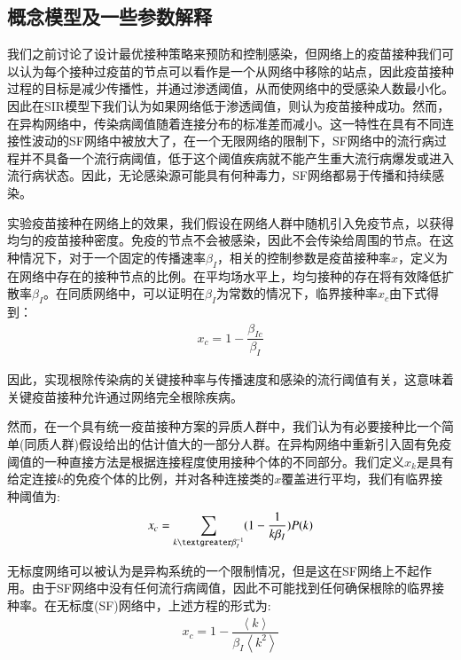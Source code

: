 \documentclass[UTF8]{ctexart}
\begin{document}
\subsection{概念模型及一些参数解释}
我们之前讨论了设计最优接种策略来预防和控制感染，但网络上的疫苗接种我们可以认为每个接种过疫苗的节点可以看作是一个从网络中移除的站点，因此疫苗接种过程的目标是减少传播性，并通过渗透阈值，从而使网络中的受感染人数最小化。因此在SIR模型下我们认为如果网络低于渗透阈值，则认为疫苗接种成功。然而，在异构网络中，传染病阈值随着连接分布的标准差而减小。这一特性在具有不同连接性波动的SF网络中被放大了，在一个无限网络的限制下，SF网络中的流行病过程并不具备一个流行病阈值，低于这个阈值疾病就不能产生重大流行病爆发或进入流行病状态。因此，无论感染源可能具有何种毒力，SF网络都易于传播和持续感染。
\par 实验疫苗接种在网络上的效果，我们假设在网络人群中随机引入免疫节点，以获得均匀的疫苗接种密度。免疫的节点不会被感染，因此不会传染给周围的节点。在这种情况下，对于一个固定的传播速率$\beta_{I}$，相关的控制参数是疫苗接种率$x$，定义为在网络中存在的接种节点的比例。在平均场水平上，均匀接种的存在将有效降低扩散率$\beta_{I}$。在同质网络中，可以证明在$\beta_{I}$为常数的情况下，临界接种率$x_{c}$由下式得到：
\begin{equation}
	\begin{aligned}
		x_{c}=1-\dfrac{\beta_{Ic}}{\beta_{I}}
	\end{aligned}
\end{equation}
\par 因此，实现根除传染病的关键接种率与传播速度和感染的流行阈值有关，这意味着关键疫苗接种允许通过网络完全根除疾病。
\par 然而，在一个具有统一疫苗接种方案的异质人群中，我们认为有必要接种比一个简单(同质人群)假设给出的估计值大的一部分人群。在异构网络中重新引入固有免疫阈值的一种直接方法是根据连接程度使用接种个体的不同部分。我们定义$x_{k}$是具有给定连接$k$的免疫个体的比例，并对各种连接类的$x$覆盖进行平均，我们有临界接种阈值为:
\begin{equation}
	\begin{aligned}
		x_{c}=\sum\limits_{k\textgreater \beta_{I}^{-1}}(1-\dfrac{1}{k\beta_{I}})P(k)
	\end{aligned}
\end{equation}
\par 无标度网络可以被认为是异构系统的一个限制情况，但是这在SF网络上不起作用。由于SF网络中没有任何流行病阈值，因此不可能找到任何确保根除的临界接种率。在无标度(SF)网络中，上述方程的形式为:
\begin{equation}
	\begin{aligned}
		x_{c}=1-\dfrac{\left\langle k\right\rangle}{\beta_{I}\left\langle k^{2}\right\rangle}
	\end{aligned}
\end{equation}
\end{document}
